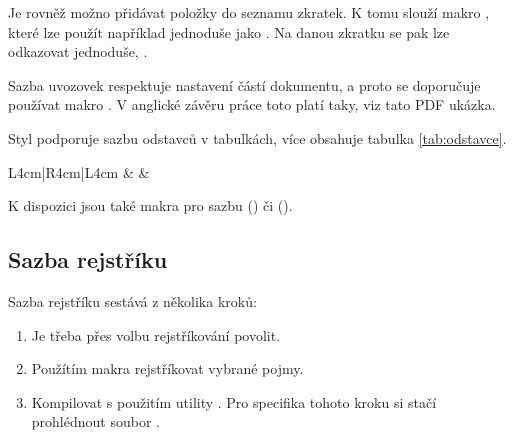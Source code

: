 \documentclass[
  field=inf,
  biblatex,
  glossaries,
  index
]{kidiplom}
\begin{document}
Je rovněž možno přidávat položky do seznamu zkratek. K tomu slouží makro , které lze použít například jednoduše jako . Na danou zkratku se pak lze odkazovat jednoduše, .

Sazba uvozovek respektuje nastavení částí dokumentu, a proto se doporučuje používat makro . V anglické závěru práce toto platí taky, viz tato PDF ukázka.

Styl podporuje sazbu odstavců v tabulkách, více obsahuje tabulka \ref{tab:odstavce}.

\begin{table}
\begin{center}
\caption{Seznam přepínačů}\label{tab:odstavce}
\begin{tabular}{L{4cm}|R{4cm}|L{4cm}}
\lipsum[23] & \lipsum[22] & \lipsum[21]
\end{tabular}
\end{center}
\end{table}

K dispozici jsou také makra pro sazbu \csharp{} () či \cpp{} ().


\subsection{Sazba rejstříku}
Sazba rejstříku sestává z několika kroků:

\begin{enumerate}
\item Je třeba přes volbu  rejstříkování povolit.
\item Použítím makra  rejstříkovat vybrané pojmy.
\item Kompilovat s použitím utility . Pro specifika tohoto kroku si stačí prohlédnout soubor .
\end{enumerate}
\end{document}
